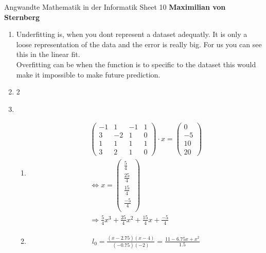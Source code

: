 \documentclass[]{book}
\theoremstyle{definition}
\begin{document}
\begin{center}
{\Large Angwandte Mathematik in der Informatik \hspace{0.5cm} Sheet 10}
\textbf{Maximilian von Sternberg} %
\end{center}

\vspace{0.2 cm}

\begin{enumerate}
    \item Underfitting is, when you dont represent a dataset adequatly. It is only a loose representation of the data and the error is really big. For us you can see this in the linear fit. \\ Overfitting can be when the function is to specific to the dataset this would make it impossible to make future prediction. 
    \item 2
    \item \begin{enumerate}
        \item \begin{align*}
            \begin{pmatrix}
                -1 & 1 & -1 & 1 \\
                3 & -2 & 1 & 0 \\
                1 & 1 & 1 & 1 \\
                3 & 2 & 1 & 0 
            \end{pmatrix}
            \cdot x = \begin{pmatrix}
                0 \\ 
                -5 \\
                10 \\
                20
            \end{pmatrix}\\
            \Leftrightarrow x = \begin{pmatrix}
                \frac{5}{4} \\
                \frac{25}{4} \\
                \frac{15}{4} \\
                \frac{-5}{4} \\
            \end{pmatrix}
            \\
            \Rightarrow \frac{5}{4}x^3 + \frac{25}{4}x^2 +\frac{15}{4}x +\frac{-5}{4}
        \end{align*}
        \item \begin{align*}
            l_0 = \frac{(x - 2.75)(x -4)}{(-0.75)(-2)} = \frac{11 - 6.75 x + x^2}{1.5}
        \end{align*}
    \end{enumerate}
\end{enumerate}
\end{document}
